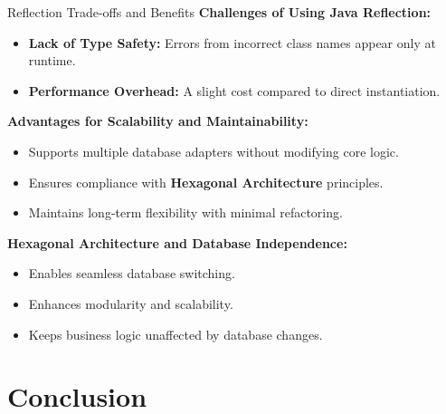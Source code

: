 \documentclass[aspectratio=169, table]{beamer}
\begin{document}
\begin{frame}[fragile]{Reflection Trade-offs and Benefits}
	\vspace{20pt}
	\textbf{Challenges of Using Java Reflection:}
	\begin{itemize}
		\item \textbf{Lack of Type Safety:} Errors from incorrect class names appear only at runtime.
		\item \textbf{Performance Overhead:} A slight cost compared to direct instantiation.
	\end{itemize}
	
	\textbf{Advantages for Scalability and Maintainability:}
	\begin{itemize}
		\item Supports multiple database adapters without modifying core logic.
		\item Ensures compliance with \textbf{Hexagonal Architecture} principles.
		\item Maintains long-term flexibility with minimal refactoring.
	\end{itemize}
	
	\textbf{Hexagonal Architecture and Database Independence:}
	\begin{itemize}
		\item Enables seamless database switching.
		\item Enhances modularity and scalability.
		\item Keeps business logic unaffected by database changes.
	\end{itemize}
\end{frame}


\section{Conclusion}
\end{document}
